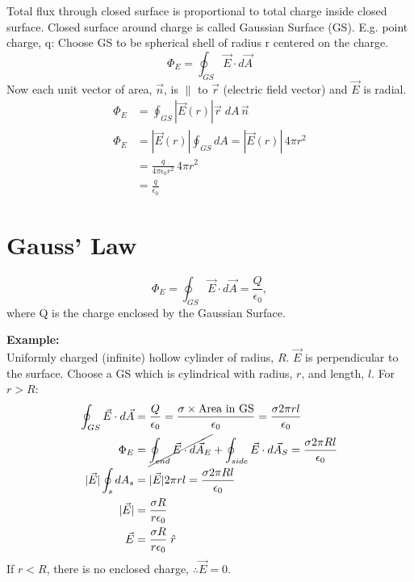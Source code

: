 \documentclass[a4paper, 11pt, normalem]{report}
\begin{document}
Total flux through closed surface is proportional to total charge inside closed surface. 
Closed surface around charge is called Gaussian Surface (GS).
E.g. point charge, q: Choose GS to be spherical shell of radius r centered on the charge.
\begin{equation}
    \Phi_{E} = \oint_{GS} \vec{E} \cdot d\vec{A}
\end{equation}
Now each unit vector of area, $\vec{n}$, is $\parallel$ to $\vec{r}$ (electric field vector) and $\vec{E}$ is radial.
\begin{align}
    \Phi_{E} &= \oint_{GS} |\vec{E}(r)| \vec{r} \; dA \, \vec{n} \\
    \Phi_{E} &= |\vec{E}(r)| \oint_{GS} dA = |\vec{E}(r)|\, 4\pi r^{2} \\
             &= \frac{q}{4\pi\epsilon_{0}r^{2}}\, 4\pi r^{2} \\
             &= \frac{q}{\epsilon_{0}}
\end{align}

\section{Gauss' Law}
\begin{equation}
    \Phi_{E} = \oint_{GS} \vec{E} \cdot d\vec{A} = \frac{Q}{\epsilon_{0}},
\end{equation}
where Q is the charge enclosed by the Gaussian Surface.

\textbf{Example:}\\
Uniformly charged (infinite) hollow cylinder of radius, $R$. 
$\vec{E}$ is perpendicular to the surface. 
Choose a GS which is cylindrical with radius, $r$, and length, $l$.
For $r > R$:
\begin{align}
    \oint_{GS} \vec{E} \cdot d\vec{A} &= \frac{Q}{\epsilon_{0}} = \frac{\sigma \times \text{Area in GS}}{\epsilon_{0}} = \frac{\sigma 2\pi r l}{\epsilon_{0}} \\
    \Phi_{E} &= \cancel{\oint_{end} \vec{E} \cdot d\vec{A}_{E}} + \oint_{side} \vec{E} \cdot d\vec{A}_{S} = \frac{\sigma 2\pi R l}{\epsilon_{0}}\\
    |\vec{E}| \oint_{s} dA_{s} &= |\vec{E}| 2\pi r l = \frac{\sigma 2\pi R l}{\epsilon_{0}} \\
    |\vec{E}| &= \frac{\sigma R}{r \epsilon_{0}} \\
    \vec{E} &= \frac{\sigma R}{r \epsilon_{0}} \; \hat{r}
\end{align}
If $r < R$, there is no enclosed charge, $\therefore \vec{E} = 0$.
\end{document}
